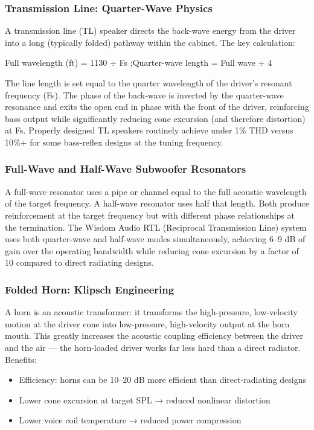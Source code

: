\documentclass[11pt,letterpaper]{article}
\begin{document}
\subsubsection{Transmission Line: Quarter-Wave Physics}

A transmission line (TL) speaker directs the back-wave energy from the driver into a long (typically folded) pathway within the cabinet. The key calculation:

\begin{center}
Full wavelength (ft) = 1130 $\div$ Fs \quad;\quad Quarter-wave length = Full wave $\div$ 4
\end{center}

The line length is set equal to the quarter wavelength of the driver's resonant frequency (Fs). The phase of the back-wave is inverted by the quarter-wave resonance and exits the open end in phase with the front of the driver, reinforcing bass output while significantly reducing cone excursion (and therefore distortion) at Fs. Properly designed TL speakers routinely achieve under 1\% THD versus 10\%+ for some bass-reflex designs at the tuning frequency.

\subsubsection{Full-Wave and Half-Wave Subwoofer Resonators}

A full-wave resonator uses a pipe or channel equal to the full acoustic wavelength of the target frequency. A half-wave resonator uses half that length. Both produce reinforcement at the target frequency but with different phase relationships at the termination. The Wisdom Audio RTL (Reciprocal Transmission Line) system uses both quarter-wave and half-wave modes simultaneously, achieving 6--9 dB of gain over the operating bandwidth while reducing cone excursion by a factor of 10 compared to direct radiating designs.

\subsubsection{Folded Horn: Klipsch Engineering}

A horn is an acoustic transformer: it transforms the high-pressure, low-velocity motion at the driver cone into low-pressure, high-velocity output at the horn mouth. This greatly increases the acoustic coupling efficiency between the driver and the air --- the horn-loaded driver works far less hard than a direct radiator. Benefits:
\begin{itemize}
  \item Efficiency: horns can be 10--20 dB more efficient than direct-radiating designs
  \item Lower cone excursion at target SPL → reduced nonlinear distortion
  \item Lower voice coil temperature → reduced power compression
\end{itemize}
\end{document}
